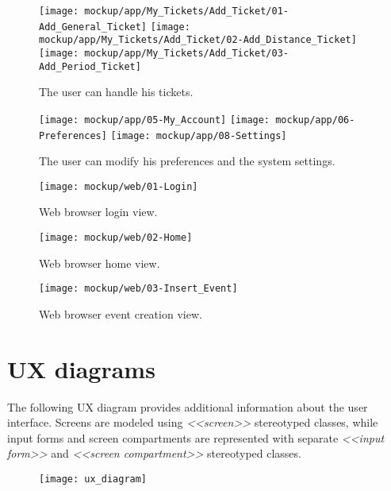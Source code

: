 	\begin{figure}[H]
		\texttt{[image: mockup/app/My\_Tickets/Add\_Ticket/01-Add\_General\_Ticket]}
		\hspace{.3cm}
		\texttt{[image: mockup/app/My\_Tickets/Add\_Ticket/02-Add\_Distance\_Ticket]}
		\hspace{.3cm}
		\texttt{[image: mockup/app/My\_Tickets/Add\_Ticket/03-Add\_Period\_Ticket]}
		\centering 
		\caption{The user can handle his tickets.}
	\end{figure}
	
	\begin{figure}[H]
		\texttt{[image: mockup/app/05-My\_Account]}
		\hspace{.3cm}
		\texttt{[image: mockup/app/06-Preferences]}
		\hspace{.3cm}
		\texttt{[image: mockup/app/08-Settings]}
		\centering 
		\caption{The user can modify his preferences and the system settings.}
	\end{figure}
	
	\begin{figure}[H]
		\texttt{[image: mockup/web/01-Login]}
		\centering
		\caption{Web browser login view.}
	\end{figure}
	\begin{figure}[H]
		\texttt{[image: mockup/web/02-Home]}
		\centering
		\caption{Web browser home view.}
	\end{figure}
	\begin{figure}[H]
		\texttt{[image: mockup/web/03-Insert\_Event]}
		\centering
		\caption{Web browser event creation view.}
	\end{figure}

\section{UX diagrams}
\label{subsect:UX diagrams}
	The following UX diagram provides additional information about the user interface.
Screens are modeled using \textit{<<screen>>} stereotyped classes, while input forms and screen compartments are represented with separate \textit{<<input form>>} and \textit{<<screen compartment>>}
stereotyped classes.
	\begin{figure}[H]
		\texttt{[image: ux\_diagram]}
		\centering
	\end{figure}
	
